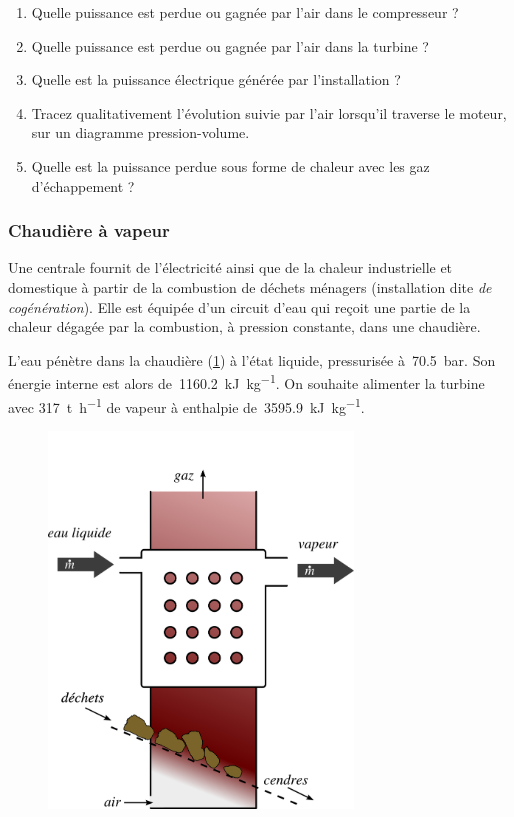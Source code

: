 	\begin{enumerate}
		\item Quelle puissance est perdue ou gagnée par l’air dans le compresseur ?
		\item Quelle puissance est perdue ou gagnée par l’air dans la turbine ?
		\item Quelle est la puissance électrique générée par l’installation ?
		\item Tracez qualitativement l’évolution suivie par l’air lorsqu’il traverse le moteur, sur un diagramme pression-volume.
		\item Quelle est la puissance perdue sous forme de chaleur avec les gaz d’échappement ?\\
	\end{enumerate}


\subsubsection{Chaudière à vapeur}
\label{exo_chaudiere_vapeur}

	Une centrale fournit de l’électricité ainsi que de la chaleur industrielle et domestique à partir de la combustion de déchets ménagers (installation dite \textit{de cogénération}). Elle est équipée d’un circuit d’eau qui reçoit une partie de la chaleur dégagée par la combustion, à pression constante, dans une chaudière.
	
	L’eau pénètre dans la chaudière (\cref{fig_boiler}) à l’état liquide, pressurisée à~\SI{70,5}{\bar}. Son énergie interne est alors de~\SI{1160,2}{\kilo\joule\per\kilogram}. On souhaite alimenter la turbine avec \SI{317}{\tonne\per\hour} de vapeur à enthalpie de~\SI{3595,9}{\kilo\joule\per\kilogram}.

	\begin{figure}
		\begin{center}
			\includegraphics[height=10cm, max width=0.9\columnwidth]{images/boiler.png}
		\end{center}
		\label{fig_boiler}
	\end{figure}
	
